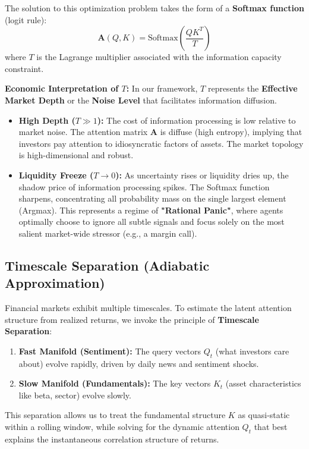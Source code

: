 \documentclass[review]{elsarticle}
\begin{document}
The solution to this optimization problem takes the form of a \textbf{Softmax function} (logit rule):
\begin{equation}
    \label{eq:attention}
    \mathbf{A}(Q, K) = \text{Softmax}\left(\frac{Q K^T}{T}\right)
\end{equation}
where $T$ is the Lagrange multiplier associated with the information capacity constraint.

\textbf{Economic Interpretation of $T$:} In our framework, $T$ represents the \textbf{Effective Market Depth} or the \textbf{Noise Level} that facilitates information diffusion.
\begin{itemize}
    \item \textbf{High Depth ($T \gg 1$):} The cost of information processing is low relative to market noise. The attention matrix $\mathbf{A}$ is diffuse (high entropy), implying that investors pay attention to idiosyncratic factors of assets. The market topology is high-dimensional and robust.
    \item \textbf{Liquidity Freeze ($T \to 0$):} As uncertainty rises or liquidity dries up, the shadow price of information processing spikes. The Softmax function sharpens, concentrating all probability mass on the single largest element (Argmax). This represents a regime of \textbf{"Rational Panic"}, where agents optimally choose to ignore all subtle signals and focus solely on the most salient market-wide stressor (e.g., a margin call).
\end{itemize}

\subsection{Timescale Separation (Adiabatic Approximation)}

Financial markets exhibit multiple timescales. To estimate the latent attention structure from realized returns, we invoke the principle of \textbf{Timescale Separation}:
\begin{enumerate}
    \item \textbf{Fast Manifold (Sentiment):} The query vectors $Q_t$ (what investors care about) evolve rapidly, driven by daily news and sentiment shocks.
    \item \textbf{Slow Manifold (Fundamentals):} The key vectors $K_t$ (asset characteristics like beta, sector) evolve slowly.
\end{enumerate}

This separation allows us to treat the fundamental structure $K$ as quasi-static within a rolling window, while solving for the dynamic attention $Q_t$ that best explains the instantaneous correlation structure of returns.
\end{document}
